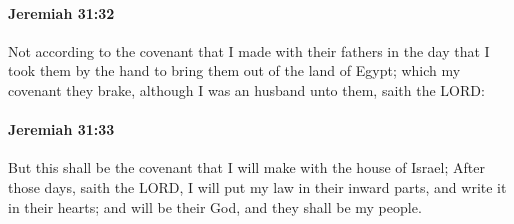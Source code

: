 		\paragraph{Jeremiah 31:32} %
			\label{JEREMIAH-31-32}

			Not according to the covenant that I made with their fathers in the day that I took them by the hand to bring them out of the land of Egypt; which my covenant they brake, although I was an husband unto them, saith the LORD:


		\paragraph{Jeremiah 31:33} %
			\label{JEREMIAH-31-33}

			But this shall be the covenant that I will make with the house of Israel; After those days, saith the LORD, I will put my law in their inward parts, and write it in their hearts; and will be their God, and they shall be my people.

